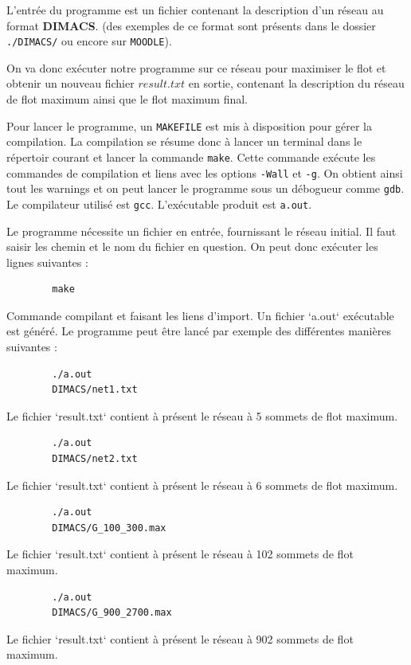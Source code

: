 \documentclass[11pt, a4paper]{report}
\begin{document}
	L'entrée du programme est un fichier contenant la description d'un réseau au format \textbf{DIMACS}. (des exemples de ce format sont présents dans le dossier \verb|./DIMACS/| ou encore sur \verb*|MOODLE|).

	On va donc exécuter notre programme sur ce réseau pour maximiser le flot et obtenir un nouveau fichier $result.txt$ en sortie, contenant la description du réseau de flot maximum ainsi que le flot maximum final.

	Pour lancer le programme, un \verb|MAKEFILE| est mis à disposition pour gérer la compilation. La compilation se résume donc à lancer un terminal dans le répertoir courant et lancer la commande \verb|make|. Cette commande exécute les commandes de compilation et liens avec les options \verb|-Wall| et \verb|-g|. On obtient ainsi tout les warnings et on peut lancer le programme sous un débogueur comme \verb|gdb|. Le compilateur utilisé est \verb|gcc|. L'exécutable produit est \verb|a.out|.

	Le programme nécessite un fichier en entrée, fournissant le réseau initial. Il faut saisir les chemin et le nom du fichier en question. On peut donc exécuter les lignes suivantes :
	\lstset{language=bash}
	\begin{lstlisting}
		make
	\end{lstlisting}
	Commande compilant et faisant les liens d'import. Un fichier `a.out` exécutable est généré. Le programme peut être lancé par exemple des différentes manières suivantes :

	\begin{lstlisting}
		./a.out
		DIMACS/net1.txt
	\end{lstlisting}
	Le fichier `result.txt` contient à présent le réseau à 5 sommets de flot maximum.

	\begin{lstlisting}
		./a.out
		DIMACS/net2.txt
	\end{lstlisting}
	Le fichier `result.txt` contient à présent le réseau à 6 sommets de flot maximum.

	\begin{lstlisting}
		./a.out
		DIMACS/G_100_300.max
	\end{lstlisting}
	Le fichier `result.txt` contient à présent le réseau à 102 sommets de flot maximum.

	\begin{lstlisting}
		./a.out
		DIMACS/G_900_2700.max
	\end{lstlisting}
	Le fichier `result.txt` contient à présent le réseau à 902 sommets de flot maximum.
\end{document}
